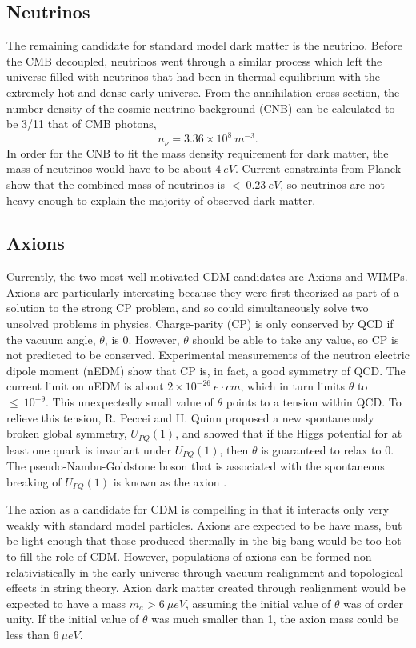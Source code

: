\subsection{Neutrinos}
The remaining candidate for standard model dark matter is the neutrino. Before the CMB decoupled, neutrinos went through a similar process which left the universe filled with neutrinos that had been in thermal equilibrium with the extremely hot and dense early universe. From the annihilation cross-section, the number density of the cosmic neutrino background (CNB) can be calculated to be 3/11 that of CMB photons\cite{ryden},
\begin{equation}
n_{\nu}=3.36 \times 10^{8} \ m^{-3}.
\end{equation}
In order for the CNB to fit the mass density requirement for dark matter, the mass of neutrinos would have to be about $4 \ eV$.\cite{ryden}  Current constraints from Planck show that the combined mass of neutrinos is $< \ 0.23 \ eV$\cite{planck2015}, so neutrinos are not heavy enough to explain the majority  of observed dark matter.


\subsection{Axions}
Currently, the two most well-motivated CDM candidates are Axions and WIMPs. Axions are particularly interesting because they were first theorized as part of a solution to the strong CP problem, and so could simultaneously solve two unsolved problems in physics. Charge-parity (CP) is only conserved by QCD if the vacuum angle, $\theta$, is 0. However,  $\theta$ should be able to take any value, so CP is not predicted to be conserved. Experimental measurements of the neutron electric dipole moment (nEDM) show that CP is, in fact, a good symmetry of QCD. The current limit on nEDM is about $2 \times 10^{-26} \ e \cdot cm$, which in turn limits $\theta$ to $\leq \ 10^{-9}$\cite{nedm,axion_DM}. This unexpectedly small value of $\theta$ points to a tension within QCD. To relieve this tension, R. Peccei and H. Quinn proposed a new spontaneously broken global symmetry, $U_{PQ}(1)$, and showed that if the Higgs potential for at least one quark is invariant under $U_{PQ}(1)$, then $\theta$ is guaranteed to relax to 0. The pseudo-Nambu-Goldstone boson that is associated with the spontaneous breaking of $U_{PQ}(1)$ is known as the axion \cite{peccei_quinn, axion_DM}.

The axion as a candidate for CDM is compelling in that it interacts only very weakly with standard model particles. Axions are expected to be have mass, but be light enough that those produced thermally in the big bang would be too hot to fill the role of CDM. However, populations of axions can be formed non-relativistically in the early universe through vacuum realignment and topological effects in string theory. Axion dark matter created through realignment would be expected to have a mass $m_{a} >6 \ \mu eV$, assuming the initial value of $\theta$ was of order unity. If the initial value of $\theta$ was much smaller than 1, the axion mass could be less than $6 \ \mu eV$\cite{axion_DM}.

